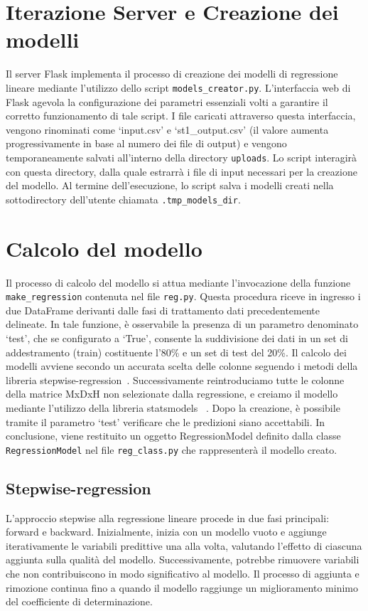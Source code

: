\documentclass{rapportECL}
\begin{document}
\section{Iterazione Server e Creazione dei modelli}

Il server Flask implementa il processo di creazione dei modelli di regressione lineare mediante l'utilizzo dello script \texttt{models\_creator.py}. 
L'interfaccia web di Flask agevola la configurazione dei parametri essenziali volti a garantire il corretto funzionamento di tale script. 
I file caricati attraverso questa interfaccia, vengono rinominati come `input.csv' e `st1\_output.csv' (il valore aumenta progressivamente in base al numero dei file di output)
e vengono temporaneamente salvati all'interno della directory \texttt{uploads}.
Lo script interagirà con questa directory, dalla quale estrarrà i file di input necessari per la creazione del modello.
Al termine dell'esecuzione, lo script salva i modelli creati nella sottodirectory dell'utente chiamata \texttt{.tmp\_models\_dir}.

\section{Calcolo del modello}
Il processo di calcolo del modello si attua mediante l'invocazione della funzione \texttt{make\_regression} contenuta nel file \texttt{reg.py}. 
Questa procedura riceve in ingresso i due DataFrame derivanti dalle fasi di trattamento dati precedentemente delineate. 
In tale funzione, è osservabile la presenza di un parametro denominato `test', che se configurato a `True', 
consente la suddivisione dei dati in un set di addestramento (train) costituente l'80\% e un set di test del 20\%.  Il calcolo dei modelli
avviene secondo un accurata scelta delle colonne seguendo i metodi della libreria stepwise-regression~\cite{stepwise-regression}. 
Successivamente reintroduciamo tutte le colonne della matrice MxDxH non selezionate dalla regressione, e creiamo il modello mediante l'utilizzo della libreria statsmodels
~\cite{statsmodels}. 
Dopo la creazione, è possibile tramite il parametro `test' verificare che le predizioni siano accettabili. In conclusione, viene restituito un oggetto RegressionModel definito 
dalla classe \texttt{RegressionModel} nel file \texttt{reg\_class.py} che rappresenterà il modello creato.

\subsection{Stepwise-regression}
L'approccio stepwise alla regressione lineare procede in due fasi principali: forward e backward. Inizialmente, inizia con un modello vuoto e 
aggiunge iterativamente le variabili predittive una alla volta, valutando l'effetto di ciascuna aggiunta sulla qualità del modello. 
Successivamente, potrebbe rimuovere variabili che non contribuiscono in modo significativo al modello.
Il processo di aggiunta e rimozione continua fino a quando il modello raggiunge un miglioramento minimo del coefficiente di determinazione.
\end{document}
